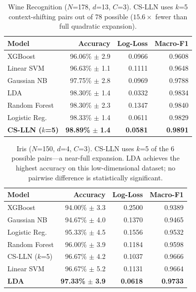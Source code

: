 \documentclass[conference]{IEEEtran}
\begin{document}
\begin{table}[!t]
\caption{Wine Recognition ($N$=178, $d$=13, $C$=3).
CS-LLN uses $k$=5 context-shifting pairs out of 78 possible ($15.6\times$
fewer than full quadratic expansion).}
\label{tab:wine}
\begin{center}
\begin{tabular}{lrrr}
\toprule
\textbf{Model}
  & \textbf{Accuracy}
  & \textbf{Log-Loss}
  & \textbf{Macro-F1} \\
\midrule
XGBoost
  & 96.06\% \(\pm\) 2.9
  & 0.0966
  & 0.9608 \\
Linear SVM
  & 96.63\% \(\pm\) 1.1
  & 0.1111
  & 0.9648 \\
Gaussian NB
  & 97.75\% \(\pm\) 2.8
  & 0.0969
  & 0.9788 \\
LDA
  & 98.30\% \(\pm\) 1.4
  & 0.0332
  & 0.9834 \\
Random Forest
  & 98.30\% \(\pm\) 2.3
  & 0.1347
  & 0.9840 \\
Logistic Reg.
  & 98.33\% \(\pm\) 1.4
  & 0.0611
  & 0.9829 \\
\textbf{CS-LLN ($k$=5)}
  & \textbf{98.89\%} \(\pm\) \textbf{1.4}
  & \textbf{0.0581}
  & \textbf{0.9891} \\
\bottomrule
\end{tabular}
\end{center}
\end{table}

\begin{table}[!t]
\caption{Iris ($N$=150, $d$=4, $C$=3). CS-LLN uses $k$=5 of the 6 possible
pairs---a near-full expansion. LDA achieves the highest accuracy on this
low-dimensional dataset; no pairwise difference is statistically significant.}
\label{tab:iris}
\begin{center}
\begin{tabular}{lrrr}
\toprule
\textbf{Model}
  & \textbf{Accuracy}
  & \textbf{Log-Loss}
  & \textbf{Macro-F1} \\
\midrule
XGBoost
  & 94.00\% \(\pm\) 3.3
  & 0.2500
  & 0.9389 \\
Gaussian NB
  & 94.67\% \(\pm\) 4.0
  & 0.1370
  & 0.9465 \\
Logistic Reg.
  & 95.33\% \(\pm\) 4.5
  & 0.1556
  & 0.9532 \\
Random Forest
  & 96.00\% \(\pm\) 3.9
  & 0.1184
  & 0.9598 \\
CS-LLN ($k$=5)
  & 96.67\% \(\pm\) 4.2
  & 0.1037
  & 0.9666 \\
Linear SVM
  & 96.67\% \(\pm\) 5.2
  & 0.1131
  & 0.9664 \\
\textbf{LDA}
  & \textbf{97.33\%} \(\pm\) \textbf{3.9}
  & \textbf{0.0618}
  & \textbf{0.9733} \\
\bottomrule
\end{tabular}
\end{center}
\end{table}
\end{document}
